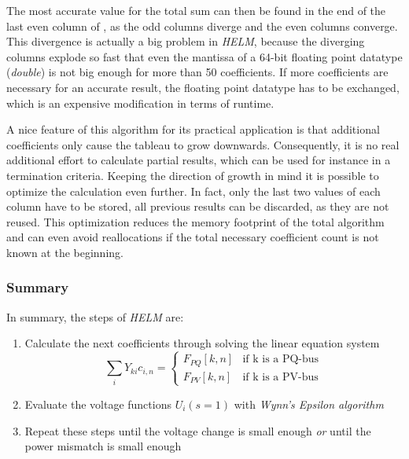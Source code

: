 The most accurate value for the total sum can then be found in the end of the last even column of , as the odd columns diverge and the even columns converge. This divergence is actually a big problem in \emph{HELM}, because the diverging columns explode so fast that even the mantissa of a 64-bit floating point datatype (\emph{double}) is not big enough for more than 50 coefficients. If more coefficients are necessary for an accurate result, the floating point datatype has to be exchanged, which is an expensive modification in terms of runtime.

A nice feature of this algorithm for its practical application is that additional coefficients only cause the tableau to grow downwards. Consequently, it is no real additional effort to calculate partial results, which can be used for instance in a termination criteria. Keeping the direction of growth in mind it is possible to optimize the calculation even further. In fact, only the last two values of each column have to be stored, all previous results can be discarded, as they are not reused. This optimization reduces the memory footprint of the total algorithm and can even avoid reallocations if the total necessary coefficient count is not known at the beginning.

\subsubsection{Summary}
In summary, the steps of \emph{HELM} are:
\begin{enumerate}
	\item Calculate the next coefficients through solving the linear equation system
	\begin{equation}
		\sum_i Y_{ki} c_{i,n} = 
		\begin{cases}
			F_{PQ}[k,n] & \text{if k is a PQ-bus} \\
			F_{PV}[k,n] & \text{if k is a PV-bus}
		\end{cases}
		\label{eq:helm_total_equation_system}
	\end{equation}
	\item Evaluate the voltage functions $U_i(s = 1)$ with \emph{Wynn's Epsilon algorithm}
	\item Repeat these steps until the voltage change is small enough \emph{or} until the power mismatch is small enough
\end{enumerate}

